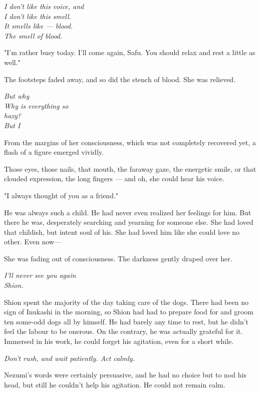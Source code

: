 \emph{I don't like this voice, and\\
	I don't like this smell.\\
	It smells like --- blood.\\
	The smell of blood.}

\myspace

"I'm rather busy today. I'll come again, Safu. You should relax and rest
a little as well."

The footsteps faded away, and so did the stench of blood. She was
relieved.

\myspace

\emph{But why\\
	Why is everything so\\
	hazy?\\
	But I}

\myspace

From the margins of her consciousness, which was not completely
recovered yet, a flash of a figure emerged vividly.

Those eyes, those nails, that mouth, the faraway gaze, the energetic
smile, or that clouded expression, the long fingers --- and oh, she could
hear his voice.

"I always thought of you as a friend."

He was always such a child. He had never even realized her feelings for
him. But there he was, desperately searching and yearning for someone
else. She had loved that childish, but intent soul of his. She had loved
him like she could love no other. Even now---

She was fading out of consciousness. The darkness gently draped over
her.

\myspace

\emph{I'll never see you again\el \\
	Shion.}

\myspace

Shion spent the majority of the day taking care of the dogs. There had
been no sign of Inukashi in the morning, so Shion had had to prepare
food for and groom ten some-odd dogs all by himself. He had barely any
time to rest, but he didn't feel the labour to be onerous. On the
contrary, he was actually grateful for it. Immersed in his work, he
could forget his agitation, even for a short while.

\emph{Don't rush, and wait patiently. Act calmly.}

Nezumi's words were certainly persuasive, and he had no choice but to
nod his head, but still he couldn't help his agitation. He could not
remain calm.

